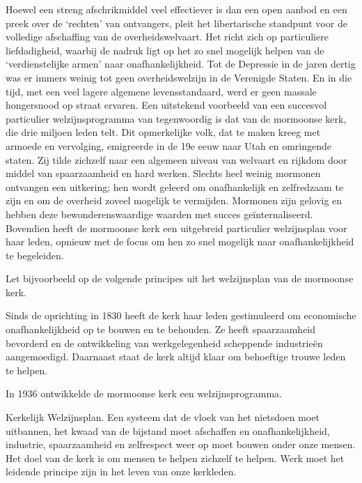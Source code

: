 \documentclass[
  a5paper,
  smalldemyvopaper,10pt,twoside,onecolumn,openright,extrafontsizes,hidelinks]{memoir}
\renewenvironment{quote}%
               {\list{}{\rightmargin=.6cm\leftmargin=.6cm}%
                \itshape \item[]}%
               {\endlist}
\begin{document}
Hoewel een streng afschrikmiddel veel effectiever is dan een open aanbod
en een preek over de `rechten' van ontvangers, pleit het libertarische
standpunt voor de volledige afschaffing van de overheidswelvaart. Het
richt zich op particuliere liefdadigheid, waarbij de nadruk ligt op het
zo snel mogelijk helpen van de `verdienstelijke armen' naar
onafhankelijkheid. Tot de Depressie in de jaren dertig was er immers
weinig tot geen overheidswelzijn in de Verenigde Staten. En in die tijd,
met een veel lagere algemene levensstandaard, werd er geen massale
hongersnood op straat ervaren. Een uitstekend voorbeeld van een
succesvol particulier welzijnsprogramma van tegenwoordig is dat van de
mormoonse kerk, die drie miljoen leden telt. Dit opmerkelijke volk, dat
te maken kreeg met armoede en vervolging, emigreerde in de 19e eeuw naar
Utah en omringende staten. Zij tilde zichzelf naar een algemeen niveau
van welvaart en rijkdom door middel van spaarzaamheid en hard werken.
Slechts heel weinig mormonen ontvangen een uitkering; hen wordt geleerd
om onafhankelijk en zelfredzaam te zijn en om de overheid zoveel
mogelijk te vermijden. Mormonen zijn gelovig en hebben deze
bewonderenswaardige waarden met succes geïnternaliseerd. Bovendien heeft
de mormoonse kerk een uitgebreid particulier welzijnsplan voor haar
leden, opnieuw met de focus om hen zo snel mogelijk naar
onafhankelijkheid te begeleiden.

Let bijvoorbeeld op de volgende principes uit het welzijnsplan van de
mormoonse kerk.

\begin{quote}
Sinds de oprichting in 1830 heeft de kerk haar leden gestimuleerd om
economische onafhankelijkheid op te bouwen en te behouden. Ze heeft
spaarzaamheid bevorderd en de ontwikkeling van werkgelegenheid
scheppende industrieën aangemoedigd. Daarnaast staat de kerk altijd
klaar om behoeftige trouwe leden te helpen.
\end{quote}

In 1936 ontwikkelde de mormoonse kerk een welzijnsprogramma.

\begin{quote}
Kerkelijk Welzijnsplan. Een systeem dat de vloek van het nietsdoen moet
uitbannen, het kwaad van de bijstand moet afschaffen en
onafhankelijkheid, industrie, spaarzaamheid en zelfrespect weer op moet
bouwen onder onze mensen. Het doel van de kerk is om mensen te helpen
zichzelf te helpen. Werk moet het leidende principe zijn in het leven
van onze kerkleden.
\end{quote}
\end{document}
